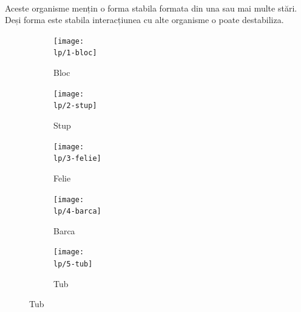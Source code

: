 \documentclass[11pt ,A4]{article}
\begin{document}
                \paragraph{}
                    Aceste organisme mențin o forma stabila formata din una sau mai multe stări.
                    Deși forma este stabila interacțiunea cu alte organisme o poate destabiliza.
                    \begin{figure}[H]

                        \newcommand\lp{organisme/stabile}
                        \newcommand\locIngScale{0.8}
                        \newcommand\locTextScale{0.33}

                        \begin{figure}[H]
                            \begin{minipage}{\locTextScale\textwidth}
                            \centering
                            \texttt{[image: \\lp/1-bloc]}
                            \caption{Bloc}
                            \end{minipage}\hfill
                            \begin{minipage}{\locTextScale\textwidth}
                            \centering
                            \texttt{[image: \\lp/2-stup]}
                            \caption{Stup}
                            \end{minipage}
                            \begin{minipage}{\locTextScale\textwidth}
                            \centering
                            \texttt{[image: \\lp/3-felie]}
                            \caption{Felie}
                            \end{minipage}
                        \end{figure}

                        \begin{figure}[H]
                            \begin{minipage}{\locTextScale\textwidth}
                            \centering
                            \texttt{[image: \\lp/4-barca]}
                            \caption{Barca}
                            \end{minipage}
                            \begin{minipage}{\locTextScale\textwidth}
                            \centering
                            \texttt{[image: \\lp/5-tub]}
                            \caption{Tub}
                            \end{minipage}
                        \end{figure}
                    \end{figure}
                       
\end{document}
